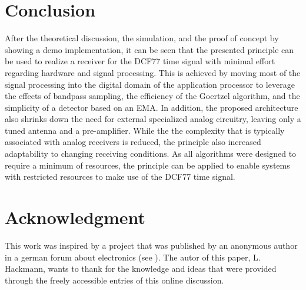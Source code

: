 \documentclass[conference]{IEEEtran}
\begin{document}
\section{Conclusion}
After the theoretical discussion, the simulation, and the proof of concept by showing a demo implementation, it can be seen that the presented principle can be used to realize a receiver for the DCF77 time signal with minimal effort regarding hardware and signal processing.
This is achieved by moving most of the signal processing into the digital domain of the application processor to leverage the effects of bandpass sampling, the efficiency of the Goertzel algorithm, and the simplicity of a detector based on an EMA.
In addition, the proposed architecture also shrinks down the need for external specialized analog circuitry, leaving only a tuned antenna and a pre-amplifier.
While the the complexity that is typically associated with analog receivers is reduced, the principle also increased adaptability to changing receiving conditions.
As all algorithms were designed to require a minimum of resources, the principle can be applied to enable systems with restricted resources to make use of the DCF77 time signal.

\section*{Acknowledgment}
This work was inspired by a project that was published by an anonymous author in a german forum about electronics (see \cite{b12}).
The autor of this paper, L. Hackmann, wants to thank for the knowledge and ideas that were provided through the freely accessible entries of this online discussion.
\end{document}
